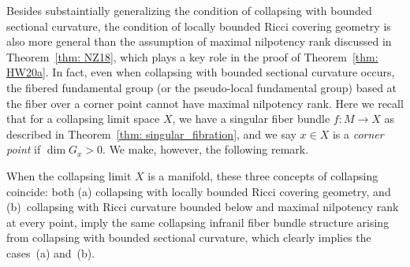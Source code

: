 \documentclass[10pt,a4paper]{amsart}
\numberwithin{equation}{section}
\begin{document}
Besides substaintially generalizing the condition of collapsing with bounded
sectional curvature, the condition of locally bounded Ricci covering geometry is
also more general than the assumption of maximal nilpotency rank discussed in
Theorem~\ref{thm: NZ18}, which plays a key role in the proof of
Theorem~\ref{thm: HW20a}. In fact, even when collapsing with bounded sectional
curvature occurs, the fibered fundamental group (or the pseudo-local
fundamental group) based at the fiber over a corner point cannot have maximal
nilpotency rank. Here we recall that for a collapsing limit space $X$, we have a
singular fiber bundle $f\colon M\to X$ as described in Theorem~\ref{thm:
singular_fibration}, and we say $x\in X$ is a \emph{corner point} if $\dim
G_x>0$. We make, however, the following remark.
\begin{Remark}
When the collapsing limit $X$ is a manifold, these three concepts of collapsing
coincide: both (a) collapsing with locally bounded Ricci covering geometry, and
(b)~collapsing with Ricci curvature bounded below and maximal nilpotency rank at
every point, imply the same collapsing infranil fiber bundle structure arising
from collapsing with bounded sectional curvature, which clearly implies the cases~(a) and~(b).
\end{Remark}
\end{document}
